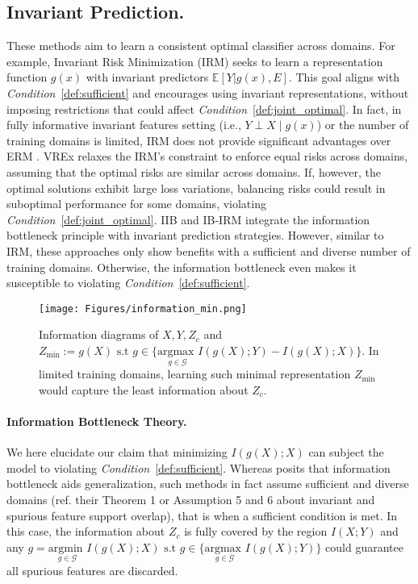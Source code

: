 \subsection{Invariant Prediction.} These methods aim to learn a consistent optimal classifier across domains. For example, Invariant Risk Minimization (IRM) \citep{arjovsky2020irm} seeks to learn a representation function $g(x)$ with invariant predictors $\mathbb{E}[Y | g(x), E]$. This goal aligns with \textit{Condition}~\ref{def:sufficient} and encourages using invariant representations, without imposing restrictions that could affect \textit{Condition}~\ref{def:joint_optimal}. In fact, in fully informative invariant features setting (i.e., $Y \!\perp\! X\mid g(x)$) or the number of training domains is limited, IRM does not provide significant advantages over ERM \citep{rosenfeld2020risks, ahuja2020empirical, ahuja2021invariance}. VREx \citep{krueger2021out} relaxes the IRM's constraint to enforce equal risks across domains, assuming that the optimal risks are similar across domains. If, however, the optimal solutions exhibit large loss variations, balancing risks could result in suboptimal performance for some domains, violating \textit{Condition}~\ref{def:joint_optimal}. IIB \citep{li2022invariant} and IB-IRM \citep{ahuja2021invariance} integrate the information bottleneck principle with invariant prediction strategies. However, similar to IRM, these approaches only show benefits with a sufficient and diverse number of training domains. Otherwise, the information bottleneck even makes it susceptible to violating \textit{Condition}~\ref{def:sufficient}. 
\begin{figure}[h!]
    \centering
\texttt{[image: Figures/information\_min.png]}
    \caption{Information diagrams of $X,Y,Z_c$ and $Z_{\text{min}} := g(X) \text{ s.t } g \in \{\underset{g\in \mathcal{G}}{\text{argmax }} I(g(X);Y) - I(g(X); X)\}$. In limited training domains, learning such minimal representation $Z_{\text{min}}$ would capture the least information about $Z_c$.}
    \label{fig:info_min}
\end{figure}

\paragraph{Information Bottleneck Theory.} We here  elucidate our claim that minimizing $I(g(X); X)$ can subject the model to violating \textit{Condition}~\ref{def:sufficient}. Whereas \cite{ahuja2021invariance} posits that information bottleneck aids generalization, such methods in fact assume sufficient and diverse domains (ref. their Theorem 1 or Assumption 5 and 6 about invariant and spurious feature support overlap), that is when a sufficient condition is met. In this case, the information about $Z_c$ is fully covered by the region $I(X;Y)$ and any $g = \underset{g\in \mathcal{G}}{\text{argmin }} I(g(X);X) \text{ s.t } g \in \{\underset{g\in \mathcal{G}}{\text{argmax }}I(g(X);Y)\}$ could guarantee all spurious features are discarded.



